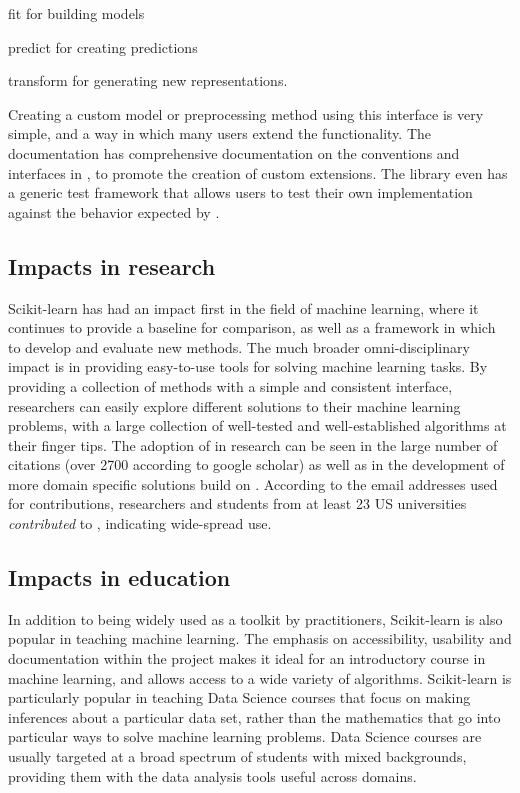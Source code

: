 fit for building models

predict for creating predictions

transform for generating new representations.

Creating a custom model or preprocessing method using this interface is very simple,
and a way in which many users extend the functionality. The \sklearn{} documentation
has comprehensive documentation on the conventions and interfaces in \sklearn{},
to promote the creation of custom extensions.
The \sklearn{} library even has a generic test framework that allows users to
test their own implementation against the behavior expected by \sklearn{}.

\subsection{Impacts in research}
Scikit-learn has had an impact first in the field of machine learning,
where it continues to provide a baseline for comparison, as well as a
framework in which to develop and evaluate new methods.
The much broader omni-disciplinary impact is in providing easy-to-use
tools for solving machine learning tasks. By providing a collection
of methods with a simple and consistent interface, researchers
can easily explore different solutions to their machine learning problems,
with a large collection of well-tested and well-established algorithms
at their finger tips.
The adoption of \sklearn{} in research can be seen in the large number
of citations (over 2700 according to google scholar) as well as in the development
of more domain specific solutions build on \sklearn{}.
According to the email addresses used for contributions, researchers and students
from at least 23 US universities \emph{contributed} to \sklearn{}, indicating wide-spread use.

\subsection{Impacts in education}
In addition to being widely used as a toolkit by practitioners,
Scikit-learn is also popular in teaching machine learning.
The emphasis on accessibility, usability and documentation within
the \sklearn{} project makes it ideal for an introductory
course in machine learning, and allows access to a wide variety
of algorithms. Scikit-learn is particularly popular in teaching
Data Science courses that focus on making inferences about
a particular data set, rather than the mathematics that go into
particular ways to solve machine learning problems.
Data Science courses are usually targeted at a broad spectrum
of students with mixed backgrounds, providing them
with the data analysis tools useful across domains.

